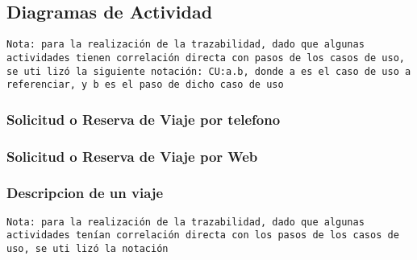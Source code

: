 \subsection{Diagramas de Actividad}

\texttt{Nota: para la realizaci\'on de la trazabilidad, dado que algunas actividades tienen correlaci\'on directa con pasos de los casos de uso, se uti
liz\'o la siguiente notaci\'on: CU:a.b, donde a es el caso de uso a referenciar, y b es el paso de dicho caso de uso}


\subsubsection{Solicitud o Reserva de Viaje por telefono}
\subsubsection{Solicitud o Reserva de Viaje por Web}
\label{da:descripcionviaje}
\subsubsection{Descripcion de un viaje}

\texttt{Nota: para la realizaci\'on de la trazabilidad, dado que algunas actividades ten\'ian correlaci\'on directa con los pasos de los casos de uso, se uti
liz\'o la notaci\'on}
